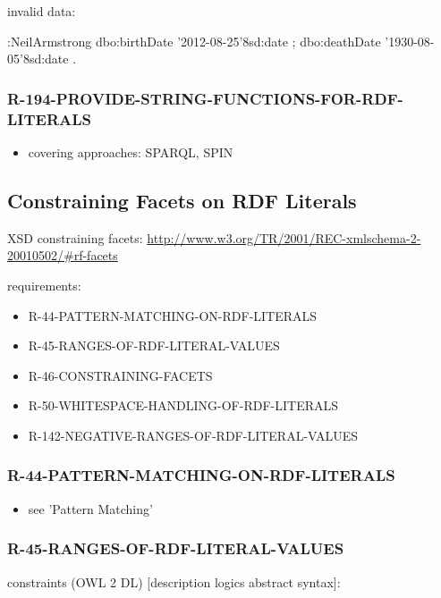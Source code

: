 \documentclass{llncs}
\begin{document}
invalid data:

\begin{ex}
:NeilArmstrong
    dbo:birthDate '2012-08-25'^^xsd:date ;
    dbo:deathDate '1930-08-05'^^xsd:date .
\end{ex}

\subsubsection{R-194-PROVIDE-STRING-FUNCTIONS-FOR-RDF-LITERALS}

\begin{itemize}
	\item covering approaches: SPARQL, SPIN
\end{itemize}

\subsection{Constraining Facets on RDF Literals}

XSD constraining facets: \url{http://www.w3.org/TR/2001/REC-xmlschema-2-20010502/#rf-facets}

requirements:

\begin{itemize}
	\item R-44-PATTERN-MATCHING-ON-RDF-LITERALS
	\item R-45-RANGES-OF-RDF-LITERAL-VALUES
	\item R-46-CONSTRAINING-FACETS
	\item R-50-WHITESPACE-HANDLING-OF-RDF-LITERALS
	\item R-142-NEGATIVE-RANGES-OF-RDF-LITERAL-VALUES
\end{itemize}

\subsubsection{R-44-PATTERN-MATCHING-ON-RDF-LITERALS}

\begin{itemize}
	\item see 'Pattern Matching'
\end{itemize}

\subsubsection{R-45-RANGES-OF-RDF-LITERAL-VALUES}

constraints (OWL 2 DL) [description logics abstract syntax]:
\end{document}
